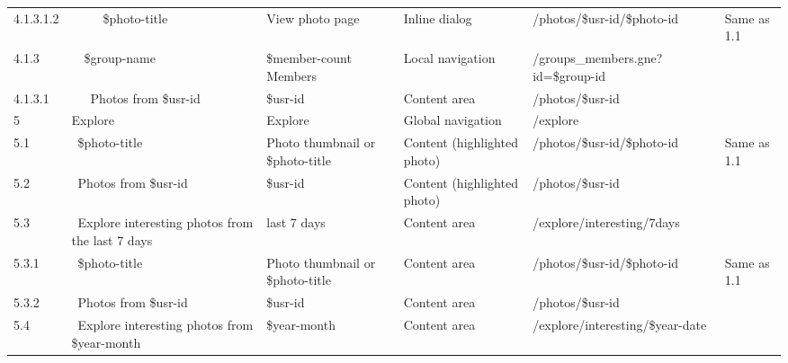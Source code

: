 \documentclass[12pt,a4paper]{article}
\begin{document}
\begin{landscape}
\begin{table}[h!b!p!]
\begin{center}
\begin{tiny}
\begin{tabular}{l|l|l|l|l|p{3cm}}
                    4.1.3.1.2 &
                    ~~~~~\$photo-title &
                    View photo page &
                    Inline dialog &
                    /photos/\$usr-id/\$photo-id &
                    Same as 1.1 \\

                4.1.3 &
                ~~\$group-name  &
                \$member-count Members &
                Local navigation &
                /groups\_members.gne?id=\$group-id &
                \\

                  4.1.3.1 &
                  ~~~Photos from \$usr-id &
                  \$usr-id &
                  Content area &
                  /photos/\$usr-id &
                  \\


            5 &
            Explore &
            Explore &
            Global navigation &
            /explore &
            \\

              5.1 &
              ~\$photo-title &
              Photo thumbnail or \$photo-title &
              Content (highlighted photo) &
              /photos/\$usr-id/\$photo-id &
              Same as 1.1 \\

              5.2 &
              ~Photos from \$usr-id &
              \$usr-id &
              Content (highlighted photo) &
              /photos/\$usr-id &
              \\

              5.3 &
              ~Explore interesting photos from the last 7 days &
              last 7 days &
              Content area &
              /explore/interesting/7days &
              \\

                5.3.1 &
                ~\$photo-title &
                Photo thumbnail or \$photo-title &
                Content area &
                /photos/\$usr-id/\$photo-id &
                Same as 1.1 \\

                5.3.2 &
                ~Photos from \$usr-id &
                \$usr-id &
                Content area &
                /photos/\$usr-id &
                \\

              5.4 &
              ~Explore interesting photos from \$year-month &
              \$year-month &
              Content area &
              /explore/interesting/\$year-date &
              \\


\end{tabular}
\end{tiny}
\end{center}
\end{table}
\end{landscape}
\end{document}
